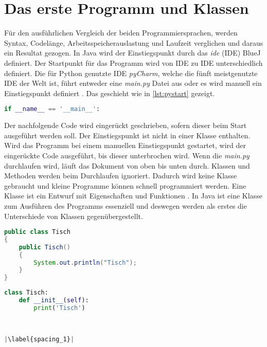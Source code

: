 \section{Das erste Programm und Klassen}

Für den ausführlichen Vergleich der beiden Programmiersprachen, werden Syntax, Codelänge, Arbeitsspeicherauslastung und Laufzeit verglichen und daraus ein Resultat gezogen.
In Java wird der Einstiegspunkt durch das \textit{\acrlong{ide}} (IDE) BlueJ definiert. Der Startpunkt für das Programm wird von IDE zu IDE unterschiedlich definiert. Die für Python genutzte IDE \textit{pyCharm}, welche die fünft meistgenutzte IDE der Welt ist, führt entweder eine \textit{main.py} Datei aus oder es wird manuell ein Einstiegspunkt definiert \cite{Github:IDE}\cite{PyCharm}. Das geschieht wie in \ref{lst:pystart} gezeigt.

\begin{lstlisting}[language=python,caption={Einstiegspunkt Python},captionpos=b,label={lst:pystart},frame=none]
if __name__ == '__main__':
\end{lstlisting}

Der nachfolgende Code wird eingerückt geschrieben, sofern dieser beim Start ausgeführt werden soll. Der Einstiegspunkt ist nicht in einer Klasse enthalten. Wird das Programm bei einem manuellen Einstiegspunkt gestartet, wird der eingerückte Code ausgeführt, bis dieser unterbrochen wird. Wenn die \textit{main.py} durchlaufen wird, läuft das Dokument von oben bis unten durch. Klassen und Methoden werden beim Durchlaufen ignoriert. Dadurch wird keine Klasse gebraucht und kleine Programme können schnell programmiert werden. Eine Klasse ist ein Entwurf mit Eigenschaften und Funktionen \cite{gfg}. In Java ist eine Klasse zum Ausführen des Programms essenziell und deswegen werden als erstes die Unterschiede von Klassen gegenübergestellt.

\begin{minipage}{.5\linewidth}
\begin{lstlisting}[language=java,caption={Klasse in Java},captionpos=b,label={lst:java:class},frame=none]
public class Tisch
{
    public Tisch()
    {
        System.out.println("Tisch");
    }
}
\end{lstlisting}
\end{minipage}
\begin{minipage}{.5\linewidth}
\begin{lstlisting}[language=python,caption={Klasse in Python},captionpos=b,label={lst:python:class},frame=l,escapechar=|]
class Tisch:
    def __init__(self):
        print('Tisch')
        
        

|\label{spacing_1}|
\end{lstlisting}
\end{minipage}

